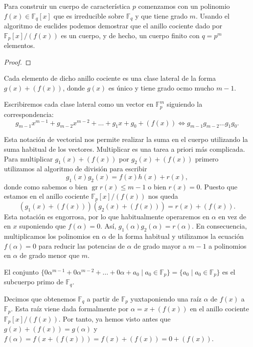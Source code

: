 Para construir un cuerpo de característica \(p\) comenzamos con un polinomio \(f(x) \in \mathbb F_q[x]\) que es irreducible sobre \(\mathbb F_q\) y que tiene grado \(m\).
Usando el algoritmo de euclides podemos demostrar que el anillo cociente dado por \(\mathbb F_p[x]/(f(x))\) es un cuerpo, y de hecho, un cuerpo finito con \(q = p^m\) elementos.

\begin{proof}
\end{proof}

Cada elemento de dicho anillo cociente es una clase lateral de la forma \(g(x) + (f(x))\), donde \(g(x)\) es único y tiene grado ocmo mucho \(m-1\).

Escribiremos cada clase lateral como un vector en \(\mathbb F_p^m\) siguiendo la correspondencia:
\[
  g_{m-1}x^{m-1} + g_{m-2}x^{m-2}+ \dots + g_1x + g_0 + (f(x)) \iff g_{m-1}g_{m-2}\dots g_1g_0.
\]

Esta notación de vectorial nos permite realizar la suma en el cuerpo utilizando la suma habitual de los vectores.
Multiplicar es una tarea a priori más complicada.
Para multiplicar \(g_1(x) + (f(x))\) por \(g_2(x) + (f(x))\) primero utilizamos al algoritmo de división para escribir
\[
  g_1(x)g_2(x) = f(x)h(x) + r(x),
\]
donde como sabemos o bien \(\operatorname{gr} r(x) \leq m -1\) o bien \(r(x) = 0\).
Puesto que estamos en el anillo cociente \(\mathbb F_p[x]/(f(x))\) nos queda
\[
  (g_1(x) + (f(x)))(g_2(x) + (f(x))) = r(x) + (f(x)).
\]
Esta notación es engorrosa, por lo que habitualmente operaremos en \(\alpha\) en vez de en \(x\) suponiendo que \(f(\alpha) = 0\).
Así, \(g_1(\alpha)g_2(\alpha) = r(\alpha)\).
En consecuencia, multiplicamos los polinomios en \(\alpha\) de la forma habitual y utilizamos la ecuación \(f(\alpha) = 0\) para reducir las potencias de \(\alpha\) de grado mayor a \(m-1\) a polinomios en \(\alpha\) de grado menor que \(m\).

El conjunto \(\{0\alpha^{m-1} + 0\alpha^{m-2} + \dots + 0\alpha + a_0 \mid a_0 \in \mathbb F_p\} = \{a_0 \mid a_0 \in \mathbb F_p\}\) es el subcuerpo primo de \(\mathbb F_q\).

Decimos que obtenemos \(\mathbb F_q\) a partir de \(\mathbb F_p\) yuxtaponiendo una raíz \(\alpha\) de \(f(x)\) a \(\mathbb F_p\).
Esta raíz viene dada formalmente por \(\alpha = x + (f(x))\) en el anillo cociente \(\mathbb F_p[x]/(f(x))\).
Por tanto, ya hemos visto antes que \(g(x) + (f(x)) = g(\alpha)\) y \(f(\alpha) = f(x + (f(x))) = f(x) + (f(x)) = 0 + (f(x))\).

